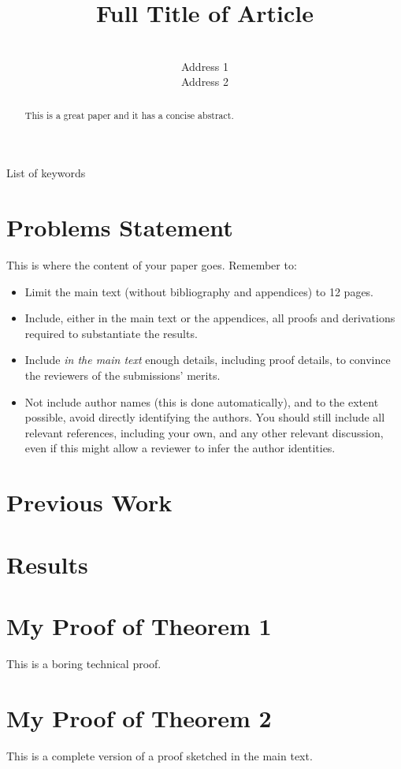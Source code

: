 \documentclass[anon]{9520} %
\title[Short Title]{Full Title of Article}
\author{\Name{Author Name1} \Email{abc@sample.com}\\
 \addr Address 1
 \AND
 \Name{Author Name2} \Email{xyz@sample.com}\\
 \addr Address 2
 }
\begin{document}
\maketitle

\begin{abstract}
This is a great paper and it has a concise abstract.
\end{abstract}

\begin{keywords}
List of keywords
\end{keywords}

\section{Problems Statement}

This is where the content of your paper goes.  Remember to:
\begin{itemize}
\item Limit the main text (without bibliography and appendices) to 12 pages.
\item Include, either in the main text or the appendices, all proofs
  and derivations required to substantiate the results.
\item Include {\em in the main text} enough details, including proof
  details, to convince the reviewers of the submissions' merits.
\item Not include author names (this is done automatically), and to
  the extent possible, avoid directly identifying the authors.  You
  should still include all relevant references, including your own,
  and any other relevant discussion, even if this might allow a
  reviewer to infer the author identities.
\end{itemize}
\newpage

\section{Previous Work}

\section{Results}

\subsection{}







\appendix

\section{My Proof of Theorem 1}

This is a boring technical proof.

\section{My Proof of Theorem 2}

This is a complete version of a proof sketched in the main text.
\end{document}
